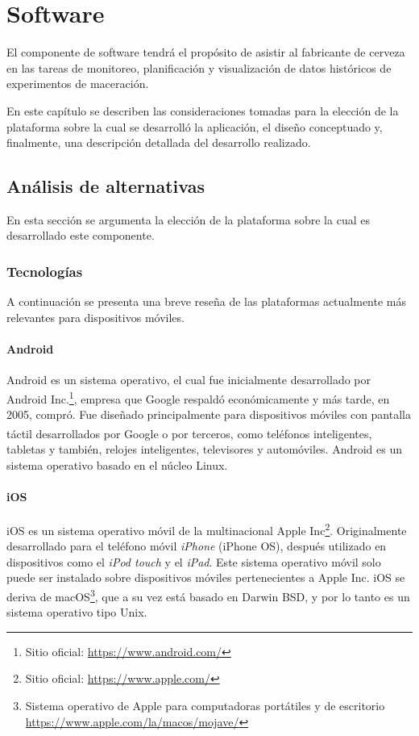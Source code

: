 \chapter{Software}
\par El componente de software tendrá el propósito de asistir al fabricante de cerveza en las tareas de monitoreo, planificación y visualización de datos históricos de experimentos de maceración.

\par En este capítulo se describen las consideraciones tomadas para la elección de la plataforma sobre la cual se desarrolló la aplicación, el diseño conceptuado y, finalmente, una descripción detallada del desarrollo realizado.

\section{Análisis de alternativas}
    En esta sección se argumenta la elección de la plataforma sobre la cual es desarrollado este componente.
    
    \subsection{Tecnologías}
        \par A continuación se presenta una breve reseña de las plataformas actualmente más relevantes para dispositivos móviles.
        
        \subsubsection{Android}
            \par Android es un sistema operativo, el cual fue inicialmente desarrollado por Android Inc.\footnote{Sitio oficial: \url{https://www.android.com/}}, empresa que Google\textsuperscript{\textregistered} respaldó económicamente y más tarde, en 2005, compró. Fue diseñado principalmente para dispositivos móviles con pantalla táctil desarrollados por Google\textsuperscript{\textregistered} o por terceros, como teléfonos inteligentes, tabletas y también, relojes inteligentes, televisores y automóviles. Android es un sistema operativo basado en el núcleo Linux.
            
        \subsubsection{iOS}
            \par iOS es un sistema operativo móvil de la multinacional Apple Inc\footnote{Sitio oficial: \url{https://www.apple.com/}}. Originalmente desarrollado para el teléfono móvil \textit{iPhone} (iPhone OS), después utilizado en dispositivos como el \textit{iPod touch} y el \textit{iPad}. Este sistema operativo móvil solo puede ser instalado sobre dispositivos móviles pertenecientes a Apple Inc. iOS se deriva de macOS\footnote{Sistema operativo de Apple para computadoras portátiles y de escritorio \url{https://www.apple.com/la/macos/mojave/}}, que a su vez está basado en Darwin BSD, y por lo tanto es un sistema operativo tipo Unix.
            
